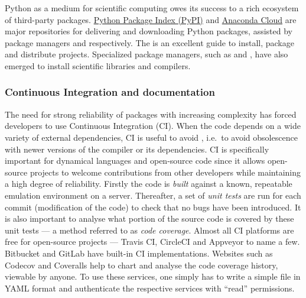 Python as a medium for scientific computing owes its success to a rich
ecosystem of third-party packages. \href{https://pypi.org}{Python Package
Index (PyPI)} and \href{https://anaconda.org}{Anaconda Cloud} are major
repositories for delivering and downloading Python packages, assisted by
package managers  and  respectively. The
 is an
excellent guide to install, package and distribute projects.
Specialized package managers, such as  and , have
also emerged to install scientific libraries and compilers.

\subsubsection{Continuous Integration and documentation} The need for
strong reliability of packages with increasing complexity has forced developers
to use Continuous Integration (CI).
%
When the code depends on a wide variety of external dependencies, CI is useful
to avoid ,
i.e.\ to avoid obsolescence with newer versions of the compiler or its
dependencies. CI is specifically important for dynamical languages and
open-source code since it allows open-source projects to welcome contributions
from other developers while maintaining a high degree of reliability.
%
Firstly the code is \emph{built} against a known, repeatable emulation
environment on a server. Thereafter, a set of \emph{unit tests} are run for
each commit (modification of the code) to check that no bugs have been
introduced. It is also important to analyse what portion of the source code is
covered by these unit tests --- a method referred to as \emph{code coverage}.
%
Almost all CI platforms are free for open-source projects --- Travis CI,
CircleCI and Appveyor to name a few. Bitbucket and GitLab have built-in CI
implementations. Websites such as Codecov and Coveralls help to chart and
analyse the code coverage history, viewable by anyone. To use these services,
one simply has to write a simple file in YAML format and authenticate the
respective services with ``read'' permissions.

